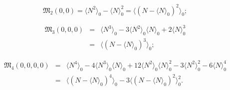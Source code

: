 \begin{equation}
	\mathfrak{M}_2(0,0) = \langle N^2 \rangle_0 - \langle N \rangle_0^2 = \langle (N - \langle N \rangle_0)^2 \rangle_0;
\end{equation}

\begin{eqnarray}
	\mathfrak{M}_3(0,0,0) &=& \langle N^3 \rangle_0 - 3 \langle N^2 \rangle_0 \langle N \rangle_0 +2\langle N \rangle_0^3
	\nonumber\\
	&=& \langle (N - \langle N \rangle_0)^3 \rangle_0;
\end{eqnarray}

\begin{eqnarray}
	\mathfrak{M}_4(0,0,0,0) &=& \langle N^4 \rangle_0 
	- 4\langle N^3 \rangle_0\langle N \rangle_0 
	+ 12\langle N^2 \rangle_0\langle N \rangle_0^2 
	- 3\langle N^2 \rangle_0^2 
	- 6\langle N \rangle_0^4
	\nonumber\\
	&=& \langle (N - \langle N \rangle_0)^4 \rangle_0 - 3 \langle (N - \langle N \rangle_0)^2 \rangle_0^2.
\end{eqnarray}